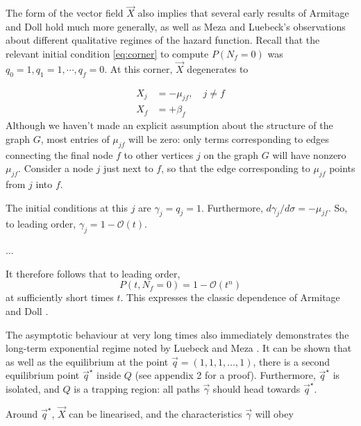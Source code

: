 \documentclass{article}
\begin{document}
The form of the vector field $\vec{X}$ also implies that several early results
of Armitage and Doll hold much more generally, as well as Meza and Luebeck's observations about different qualitative regimes of the hazard function\cite{armitage1957two,meza2008age}. Recall that the relevant initial condition \eqref{eq:corner} to compute $P(N_f = 0)$ was $q_0 = 1, q_1 = 1, \cdots, q_f = 0$.  At this corner, $\vec{X}$ degenerates to

\begin{align}
    X_j &= - \mu_{jf}, \quad j \neq f
    \nonumber \\
    X_f &= + \beta_f
\end{align}
Although we haven't made an explicit assumption about the structure of the graph
$G$, most entries of $\mu_{jf}$ will be zero: only terms corresponding to edges
connecting the final node $f$ to other vertices $j$ on the graph $G$ will have
nonzero $\mu_{jf}$. Consider a node $j$ just next to $f$, so that the edge
corresponding to $\mu_{jf}$ points from $j$ into $f$.

The initial conditions at this $j$ are $\gamma_j = q_j = 1$. Furthermore, $d
\gamma_j / d\sigma = -\mu_{jf}$. So, to leading order, $\gamma_j = 1 -
\mathcal{O}(t)$.


...

It therefore follows that to leading order, 
\begin{equation}
    P(t, N_f = 0) = 1 - \mathcal{O}(t^n)
\end{equation}
at sufficiently short times $t$. This expresses the classic dependence of
Armitage and Doll \cite{armitage_doll}.

The asymptotic behaviour at very long times also immediately demonstrates the
long-term exponential regime noted by Luebeck and Meza \cite{meza2008age}.
It can be shown that as well as the equilibrium at the point $\vec{q} =
(1,1,1,\dots,1)$, there is a second equilibrium point $\vec{q}^\star$ inside $Q$ (see appendix 2
for a proof). Furthermore, $\vec{q}^\star$ is isolated, and $Q$ is a trapping region:
all paths $\vec{\gamma}$ should head towards $\vec{q}^\star$.

Around $\vec{q}^\star$, $\vec{X}$ can be linearised, and the characteristics
$\vec{\gamma}$ will obey
\end{document}
